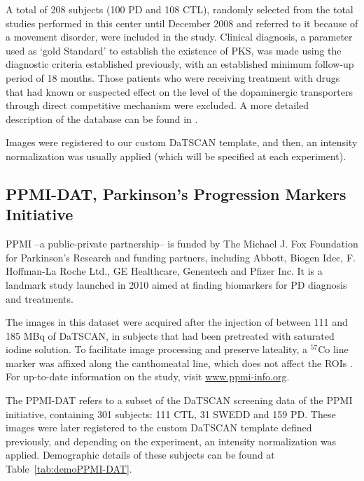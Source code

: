 A total of 208 subjects (100 \ac{PD} and 108 \ac{CTL}), randomly selected from the total studies performed in this center until December 2008 and referred to it because of a movement disorder, were included in the study. Clinical diagnosis, a parameter used as `gold Standard' to establish the existence of \ac{PKS}, was made using the diagnostic criteria established previously, with an established minimum follow-up period of 18 months. Those patients who were receiving treatment with drugs that had known or suspected effect on the level of the dopaminergic transporters through direct competitive mechanism were excluded. A more detailed description of the database can be found in \cite{Lozano2007}.

Images were registered to our custom DaTSCAN template, and then, an intensity normalization was usually applied (which will be specified at each experiment). 

\subsection{PPMI-DAT, Parkinson's Progression Markers Initiative}\label{sec:ppmi}
\ac{PPMI} --a public-private partnership-- is funded by The Michael J. Fox Foundation for Parkinson's Research and funding partners, including Abbott, Biogen Idec, F. Hoffman-La Roche Ltd., GE Healthcare, Genentech and Pfizer Inc. It is a landmark study launched in 2010 aimed at finding biomarkers for \ac{PD} diagnosis and treatments. 

The images in this dataset were acquired after the injection of between 111 and 185 MBq of DaTSCAN, in subjects that had been pretreated with saturated iodine solution. To facilitate image processing and preserve lateality, a $^{57}$Co line marker was affixed along the canthomeatal line, which does not affect the \acp{ROI} \cite{PPMI,Inititative2010}. For up-to-date information on the study, visit \url{www.ppmi-info.org}.

The PPMI-DAT refers to a subset of the DaTSCAN screening data of the \ac{PPMI} initiative, containing 301 subjects: 111 \ac{CTL}, 31 \ac{SWEDD} and 159 \ac{PD}. These images were later registered to the custom DaTSCAN template defined previously, and depending on the experiment, an intensity normalization was applied. Demographic details of these subjects can be found at Table~\ref{tab:demoPPMI-DAT}.

